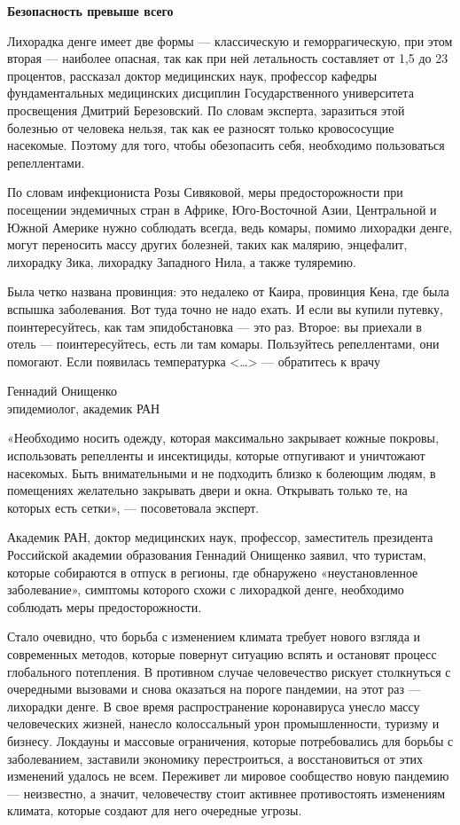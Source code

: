 \textbf{Безопасность превыше всего}

Лихорадка денге имеет две формы — классическую и геморрагическую, при этом вторая — наиболее опасная, так как при ней летальность составляет от 1,5 до 23 процентов, рассказал доктор медицинских наук, профессор кафедры фундаментальных медицинских дисциплин Государственного университета просвещения Дмитрий Березовский. По словам эксперта, заразиться этой болезнью от человека нельзя, так как ее разносят только кровососущие насекомые. Поэтому для того, чтобы обезопасить себя, необходимо пользоваться репеллентами.

По словам инфекциониста Розы Сивяковой, меры предосторожности при посещении эндемичных стран в Африке, Юго-Восточной Азии, Центральной и Южной Америке нужно соблюдать всегда, ведь комары, помимо лихорадки денге, могут переносить массу других болезней, таких как малярию, энцефалит, лихорадку Зика, лихорадку Западного Нила, а также туляремию.

\begin{fancyquotes}
    Была четко названа провинция: это недалеко от Каира, провинция Кена, где была вспышка заболевания. Вот туда точно не надо ехать. И если вы купили путевку, поинтересуйтесь, как там эпидобстановка — это раз. Второе: вы приехали в отель — поинтересуйтесь, есть ли там комары. Пользуйтесь репеллентами, они помогают. Если появилась температурка <…> — обратитесь к врачу

    \begin{flushright}
        Геннадий Онищенко\\
        эпидемиолог, академик РАН
    \end{flushright}
\end{fancyquotes}

«Необходимо носить одежду, которая максимально закрывает кожные покровы, использовать репелленты и инсектициды, которые отпугивают и уничтожают насекомых. Быть внимательными и не подходить близко к болеющим людям, в помещениях желательно закрывать двери и окна. Открывать только те, на которых есть сетки», — посоветовала эксперт.

Академик РАН, доктор медицинских наук, профессор, заместитель президента Российской академии образования Геннадий Онищенко заявил, что туристам, которые собираются в отпуск в регионы, где обнаружено «неустановленное заболевание», симптомы которого схожи с лихорадкой денге, необходимо соблюдать меры предосторожности.

Стало очевидно, что борьба с изменением климата требует нового взгляда и современных методов, которые повернут ситуацию вспять и остановят процесс глобального потепления. В противном случае человечество рискует столкнуться с очередными вызовами и снова оказаться на пороге пандемии, на этот раз — лихорадки денге. В свое время распространение коронавируса унесло массу человеческих жизней, нанесло колоссальный урон промышленности, туризму и бизнесу. Локдауны и массовые ограничения, которые потребовались для борьбы с заболеванием, заставили экономику перестроиться, а восстановиться от этих изменений удалось не всем. Переживет ли мировое сообщество новую пандемию — неизвестно, а значит, человечеству стоит активнее противостоять изменениям климата, которые создают для него очередные угрозы.

